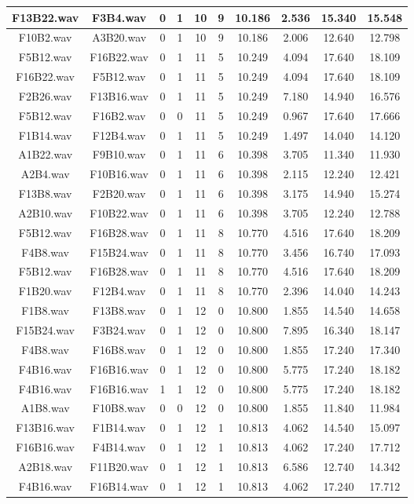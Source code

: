 \documentclass[11pt,a4paper]{book}
\begin{document}
\begin{longtable}[c]{|c|c|c|c|c|c|c|c|c|c|}
F13B22.wav&F3B4.wav&0&1&10&9&10.186&2.536&15.340&15.548\\ \hline
F10B2.wav&A3B20.wav&0&1&10&9&10.186&2.006&12.640&12.798\\ \hline
F5B12.wav&F16B22.wav&0&1&11&5&10.249&4.094&17.640&18.109\\ \hline
F16B22.wav&F5B12.wav&0&1&11&5&10.249&4.094&17.640&18.109\\ \hline
F2B26.wav&F13B16.wav&0&1&11&5&10.249&7.180&14.940&16.576\\ \hline
F5B12.wav&F16B2.wav&0&0&11&5&10.249&0.967&17.640&17.666\\ \hline
F1B14.wav&F12B4.wav&0&1&11&5&10.249&1.497&14.040&14.120\\ \hline
A1B22.wav&F9B10.wav&0&1&11&6&10.398&3.705&11.340&11.930\\ \hline
A2B4.wav&F10B16.wav&0&1&11&6&10.398&2.115&12.240&12.421\\ \hline
F13B8.wav&F2B20.wav&0&1&11&6&10.398&3.175&14.940&15.274\\ \hline
A2B10.wav&F10B22.wav&0&1&11&6&10.398&3.705&12.240&12.788\\ \hline
F5B12.wav&F16B28.wav&0&1&11&8&10.770&4.516&17.640&18.209\\ \hline
F4B8.wav&F15B24.wav&0&1&11&8&10.770&3.456&16.740&17.093\\ \hline
F5B12.wav&F16B28.wav&0&1&11&8&10.770&4.516&17.640&18.209\\ \hline
F1B20.wav&F12B4.wav&0&1&11&8&10.770&2.396&14.040&14.243\\ \hline
F1B8.wav&F13B8.wav&0&1&12&0&10.800&1.855&14.540&14.658\\ \hline
F15B24.wav&F3B24.wav&0&1&12&0&10.800&7.895&16.340&18.147\\ \hline
F4B8.wav&F16B8.wav&0&1&12&0&10.800&1.855&17.240&17.340\\ \hline
F4B16.wav&F16B16.wav&0&1&12&0&10.800&5.775&17.240&18.182\\ \hline
F4B16.wav&F16B16.wav&1&1&12&0&10.800&5.775&17.240&18.182\\ \hline
A1B8.wav&F10B8.wav&0&0&12&0&10.800&1.855&11.840&11.984\\ \hline
F13B16.wav&F1B14.wav&0&1&12&1&10.813&4.062&14.540&15.097\\ \hline
F16B16.wav&F4B14.wav&0&1&12&1&10.813&4.062&17.240&17.712\\ \hline
A2B18.wav&F11B20.wav&0&1&12&1&10.813&6.586&12.740&14.342\\ \hline
F4B16.wav&F16B14.wav&0&1&12&1&10.813&4.062&17.240&17.712\\ \hline

\end{longtable}
\end{document}
